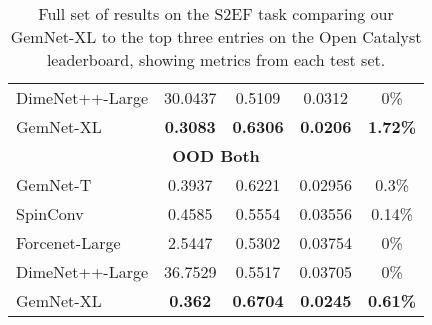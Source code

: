 \documentclass{article} \usepackage{iclr2022_conference,times}
\newcommand{\mc}[3]{\multicolumn{#1}{#2}{#3}}
\begin{document}
\begin{table*}[htb]
\begin{tabular}{l|cccc}
        DimeNet++-Large & 30.0437	& 0.5109	& 0.0312 & 0\% \\
        GemNet-XL & \textbf{0.3083} & \textbf{0.6306} & \textbf{0.0206} & \textbf{1.72\%} \\
        \midrule
        \mc{5}{c}{\textbf{OOD Both}} \\
        GemNet-T & 0.3937 & 0.6221 & 0.02956 & 0.3\% \\
        SpinConv & 0.4585 & 0.5554 & 0.03556 & 0.14\% \\
        Forcenet-Large &	2.5447	& 0.5302 & 0.03754 & 0\% \\
        DimeNet++-Large & 36.7529 & 0.5517 & 0.03705 & 0\% \\
        GemNet-XL & \textbf{0.362} & \textbf{0.6704} & \textbf{0.0245} & \textbf{0.61\%} \\
        \bottomrule
    \end{tabular}
\caption{Full set of results on the S2EF task comparing our GemNet-XL to the top three entries on the Open Catalyst leaderboard, showing metrics from each test set. }
    \label{tab:s2ef_results_full}
\end{table*}
\end{document}
